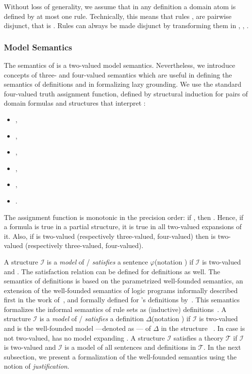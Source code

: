 \documentclass[11pt]{article}
\newcommand{\m}[1]{\ensuremath{#1}\xspace}
\newcommand{\I}{\m{\mathcal{I}}}
\newcommand{\theory}{\m{\mathcal{T}}}
\newcommand{\D}{\m{\Delta}}
\newcommand{\f}{\m{\varphi}}
\newcommand{\open}[1]{\m{#1_{open}}}
\newcommand{\logicname}[1]{\text{\sc #1}\xspace}
\newcommand{\foid}{\logicname{FO(\ensuremath{ID})}}
\theoremstyle{plain}
\theoremstyle{definition}
\theoremstyle{example_basic}
\theoremstyle{example_contd}
\theoremstyle{plain}
\newcommand{\change}[1]{#1}
\begin{document}
Without loss of generality, we assume that in any definition a domain
atom is defined by at most one rule. \change{Technically, this means that rules ,  are pairwise disjunct, that is
. Rules can always be made disjunct by
transforming them in , , .}


\subsubsection{Model Semantics}
\change{The semantics of \foid is a two-valued model semantics. Nevertheless, we
introduce concepts of three- and four-valued semantics which are
useful in defining the semantics of definitions and in 
formalizing lazy grounding. We use the standard four-valued truth
assignment function, defined by structural induction for pairs of \FO
domain formulas  and structures  that interpret
:}
\begin{itemize}
\item ,
\item ,
\item ,
\item ,
\item ,
\item .
\end{itemize}
The assignment function is monotonic in the precision order: if , then .  Hence, if a formula is true in a partial structure, it is true in all two-valued expansions of it. \change{Also, if  is two-valued (respectively three-valued, four-valued) then  is two-valued (respectively three-valued, four-valued).}

A structure \I is a \emph{model} of / \emph{satisfies} a sentence \f (notation ) if \I is two-valued and . The satisfaction relation can be defined for definitions as well. The semantics of definitions is based on the parametrized well-founded semantics, an extension of the well-founded semantics of logic programs informally described first in the work of~, and formally defined for \foid's definitions by~. This semantics formalizes the informal semantics of rule sets as (inductive) definitions~\cite{Denecker98,tocl/DeneckerBM01,KR/DeneckerV14}.  A structure \I is a \emph{model} of / \emph{satisfies} a definition \D (notation ) if \I is two-valued and is the well-founded model ---denoted as --- of \D in the structure \restr{\I}{\open{\D}}~\cite{tocl/DeneckerT08}. In case  is not two-valued,  has no model expanding . A structure \I satisfies a theory \theory if \I is two-valued and \I is a model of all sentences and definitions in \theory. In the next subsection, we present a formalization of the well-founded semantics using the notion of {\em justification}.
\end{document}
